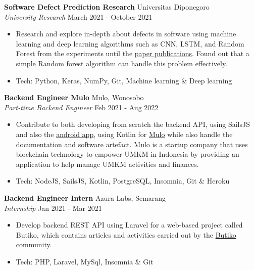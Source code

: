 \documentclass[a4paper]{article}
\begin{document}
\textbf{Software Defect Prediction Research} \hfill Universitas Diponegoro\\
\textit{University Research} \hfill March 2021 - October 2021\\
\vspace{-1mm}
\begin{itemize} \itemsep 1pt
	\item Research and explore in-depth about defects in software using machine learning and deep learning algorithms such as CNN, LSTM, and Random Forest from the experiments until the
	\href{https://github.com/mhnaufal/Software-Defect-Finale/blob/main/reports/PAPER-Software%20Defect%20Prediction.pdf}{paper publications}. Found out that a simple Random forest algorithm can handle this problem effectively.
	\item Tech: Python, Keras, NumPy, Git, Machine learning \& Deep learning
\end{itemize}

\textbf{Backend Engineer Mulo} \hfill Mulo, Wonosobo\\
\textit{Part-time Backend Engineer} \hfill Feb 2021 - Aug 2022\\
\vspace{-1mm}
\begin{itemize} \itemsep 1pt
	\item Contribute to both developing from scratch the backend API, using SailsJS and also the \href{https://play.google.com/store/apps/details?id=app.mulo}{android app}, using Kotlin for \href{https://muloapp.id/}{Mulo} while also handle the documentation and software artefact. Mulo is a startup company that uses blockchain technology to empower UMKM in Indonesia by providing an application to help manage UMKM activities and finances.
	\item Tech: NodeJS, SailsJS, Kotlin, PostgreSQL, Insomnia, Git \& Heroku
\end{itemize}

\textbf{Backend Engineer Intern} \hfill Azura Labs, Semarang\\
\textit{Internship} \hfill Jan 2021 - Mar 2021\\
\vspace{-1mm}
\begin{itemize} \itemsep 1pt
	\item Develop backend REST API using Laravel for a web-based project called \textquotesingle{}Butiko\textquotesingle{}, which contains articles and activities carried out by the \textquotesingle{}\href{https://butiko.id/}{Butiko}\textquotesingle{} community.
	\item Tech: PHP, Laravel, MySql, Insomnia \& Git
\end{itemize}
\end{document}
